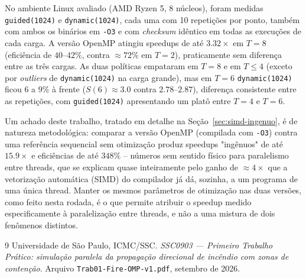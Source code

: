 \documentclass[12pt,a4paper]{article}
\begin{document}
No ambiente Linux avaliado (AMD Ryzen 5, 8 núcleos), foram medidas
\texttt{guided(1024)} e \texttt{dynamic(1024)}, cada uma com 10
repetições por ponto, também com ambos os binários em \texttt{-O3} e com
\emph{checksum} idêntico em todas as execuções de cada carga. A versão
OpenMP atingiu speedups de até $3.32\times$ em $T=8$ (eficiência de
$40$--$42\%$, contra $\approx\!72\%$ em $T=2$), praticamente sem diferença
entre as três cargas. As duas políticas empataram em $T=8$ e em $T\le4$
(exceto por \emph{outliers} de \texttt{dynamic(1024)} na carga grande),
mas em $T=6$ \texttt{dynamic(1024)} ficou $6$ a $9\%$ à frente
($S(6)\approx3.0$ contra $2.78$--$2.87$), diferença consistente entre as
repetições, com \texttt{guided(1024)} apresentando um platô entre $T=4$ e
$T=6$.

Um achado deste trabalho, tratado em detalhe na
Seção~\ref{sec:simd-ingenuo}, é de natureza metodológica: comparar a
versão OpenMP (compilada com \texttt{-O3}) contra uma referência
sequencial sem otimização produz speedups "ingênuos" de até
$15.9\times$ e eficiências de até $348\%$ -- números sem sentido físico
para paralelismo entre threads, que se explicam quase inteiramente pelo
ganho de $\approx\!4\times$ que a vetorização automática (SIMD) do
compilador já dá, sozinha, a um programa de uma única thread. Manter os
mesmos parâmetros de otimização nas duas versões, como feito nesta
rodada, é o que permite atribuir o speedup medido especificamente à
paralelização entre threads, e não a uma mistura de dois fenômenos
distintos.



\begin{thebibliography}{9}
Universidade de São Paulo, ICMC/SSC.
\textit{SSC0903 --- Primeiro Trabalho Prático: simulação paralela da
propagação direcional de incêndio com zonas de contenção}.
Arquivo \texttt{Trab01-Fire-OMP-v1.pdf}, setembro de 2026.
\end{thebibliography}
\end{document}
